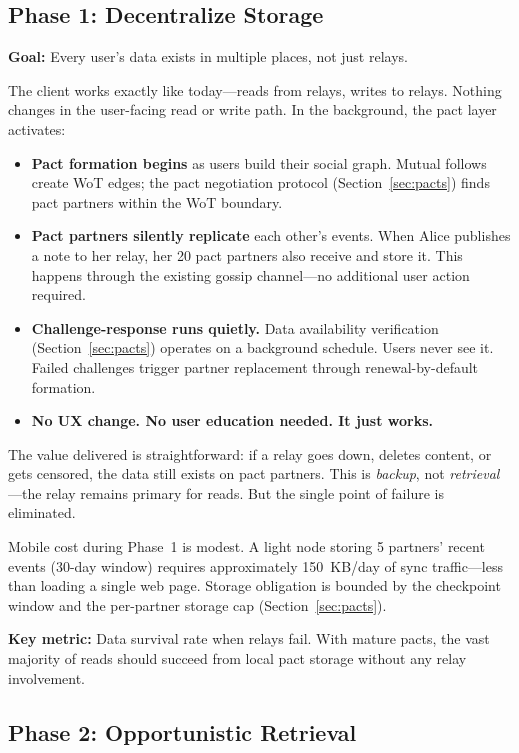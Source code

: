 \documentclass[11pt,a4paper]{article}
\begin{document}
\subsection{Phase 1: Decentralize Storage}

\textbf{Goal:} Every user's data exists in multiple places, not just relays.

The client works exactly like today---reads from relays, writes to relays. Nothing changes in the user-facing read or write path. In the background, the pact layer activates:

\begin{itemize}
  \item \textbf{Pact formation begins} as users build their social graph. Mutual follows create WoT edges; the pact negotiation protocol (Section~\ref{sec:pacts}) finds pact partners within the WoT boundary.
  \item \textbf{Pact partners silently replicate} each other's events. When Alice publishes a note to her relay, her 20 pact partners also receive and store it. This happens through the existing gossip channel---no additional user action required.
  \item \textbf{Challenge-response runs quietly.} Data availability verification (Section~\ref{sec:pacts}) operates on a background schedule. Users never see it. Failed challenges trigger partner replacement through renewal-by-default formation.
  \item \textbf{No UX change. No user education needed. It just works.}
\end{itemize}

The value delivered is straightforward: if a relay goes down, deletes content, or gets censored, the data still exists on pact partners. This is \emph{backup}, not \emph{retrieval}---the relay remains primary for reads. But the single point of failure is eliminated.

Mobile cost during Phase~1 is modest. A light node storing 5 partners' recent events (30-day window) requires approximately 150~KB/day of sync traffic---less than loading a single web page. Storage obligation is bounded by the checkpoint window and the per-partner storage cap (Section~\ref{sec:pacts}).

\textbf{Key metric:} Data survival rate when relays fail. With mature pacts, the vast majority of reads should succeed from local pact storage without any relay involvement.

\subsection{Phase 2: Opportunistic Retrieval}
\end{document}
